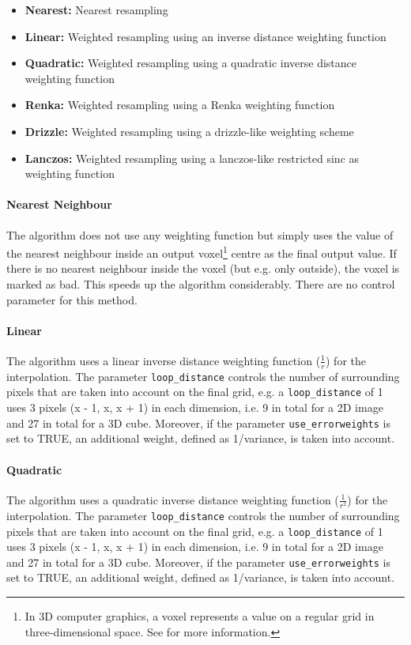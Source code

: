 \begin{center}
\begin{itemize}
\item {\bf Nearest:} Nearest  resampling
\item {\bf Linear:} Weighted resampling using an inverse distance weighting function
\item {\bf Quadratic:} Weighted resampling using a quadratic inverse distance weighting function
\item {\bf Renka:} Weighted resampling using a Renka weighting function
\item {\bf Drizzle:} Weighted resampling using a drizzle-like weighting scheme
\item {\bf Lanczos:} Weighted resampling using a lanczos-like restricted sinc as weighting function
\end{itemize}
\end{center}

\paragraph{Nearest Neighbour}
\label{resampling:algorithms:nearest}
The algorithm does not use any weighting function but simply uses the value of
the nearest neighbour inside an output voxel\footnote{In 3D computer graphics, a voxel represents a value on a regular grid in three-dimensional space. See  for more information.} centre as the final output value. If
there is no nearest neighbour inside the voxel (but e.g. only outside), the voxel
is marked as bad. This speeds up the algorithm considerably. There are no
control parameter for this method.

\paragraph{Linear}
\label{resampling:algorithms:linear}
The algorithm uses a linear inverse distance weighting function ($\frac{1}{r}$)
for the interpolation. The parameter \verb+loop_distance+ controls the number of
surrounding pixels that are taken into account on the final grid, e.g. a
\verb+loop_distance+ of 1 uses 3 pixels (x - 1, x, x + 1) in each dimension,
i.e.  9 in total for a 2D image and 27 in total for a 3D cube. Moreover, if the
parameter \verb+use_errorweights+ is set to TRUE, an additional weight, defined
as 1/variance, is taken into account\footnotemark.
 
\paragraph{Quadratic}
\label{resampling:algorithms:quadratic}
The algorithm uses a quadratic inverse distance weighting function
($\frac{1}{r^2}$) for the interpolation. The parameter \verb+loop_distance+
controls the number of surrounding pixels that are taken into account on the
final grid, e.g. a \verb+loop_distance+ of 1 uses 3 pixels (x - 1, x, x + 1) in
each dimension, i.e.  9 in total for a 2D image and 27 in total for a 3D
cube. Moreover, if the parameter \verb+use_errorweights+ is set to
TRUE, an additional weight, defined as 1/variance,
is taken into account\footnotemark[\value{footnote}].
 
